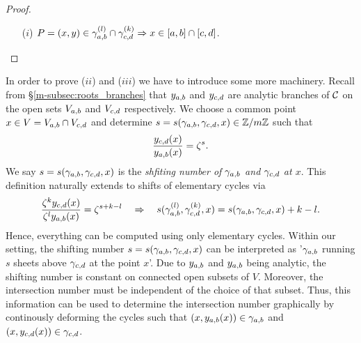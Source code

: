 \documentclass[main.tex]{subfiles}
\begin{document}
  \begin{proof}\let\qed\relax
   \begin{itemize}
    \item[($i$)] $P = (x,y) \in \gamma_{a,b}^{(l)} \cap \gamma_{c,d}^{(k)}   \Rightarrow  x \in [a,b] \cap [c,d]$.
   \end{itemize}
  \end{proof}

  In order to prove ($ii$) and ($iii$) we have to introduce some more machinery. Recall from \S \ref{m-subsec:roots_branches} that $y_{a,b}$ and $y_{c,d}$ are analytic branches of $\mathcal{C}$ on the open sets
  $V_{a,b}$ and $V_{c,d}$ respectively. \abstandl
  We choose a common point $x \in V = V_{a,b} \cap V_{c,d}$ and determine $s  = s(\gamma_{a,b},\gamma_{c,d},x) \in \mathbb{Z}/m\mathbb{Z}$  such that
  \begin{align}
   \frac{y_{c,d}(x)}{y_{a,b}(x)} = \zeta^s .
  \end{align}
  We say $s  = s(\gamma_{a,b},\gamma_{c,d},x)$ is the \emph{shfiting number of $\gamma_{a,b}$ and $\gamma_{c,d}$ at $x$}.
  This definition naturally extends to shifts of elementary cycles via
\begin{align}\label{eq:shift_numb_rel}
  \frac{\zeta^ky_{c,d}(x)}{\zeta^ly_{a,b}(x)} = \zeta^{s+k-l} \quad \Rightarrow \quad s(\gamma_{a,b}^{(l)},\gamma_{c,d}^{(k)},x) = s(\gamma_{a,b},\gamma_{c,d},x) + k - l.
\end{align}
 Hence, everything can be computed using only elementary cycles. \abstandl
 Within our setting, the shifting number $s=s(\gamma_{a,b},\gamma_{c,d},x)$  can be interpreted as '$\gamma_{a,b}$ running $s$ sheets above $\gamma_{c,d}$ at the point $x$'.
 Due to $y_{a,b}$ and $y_{a,b}$ being analytic, the shifting number is constant on connected open subsets of $V$. Moreover, the intersection number must be independent of the choice of that subset. \abstandl
 Thus,
 this information can be used to determine
 the intersection number graphically by continously deforming the cycles such that $(x,y_{a,b}(x)) \in \gamma_{a,b}$ and $(x,y_{c,d}(x)) \in \gamma_{c,d}$.
\end{document}
